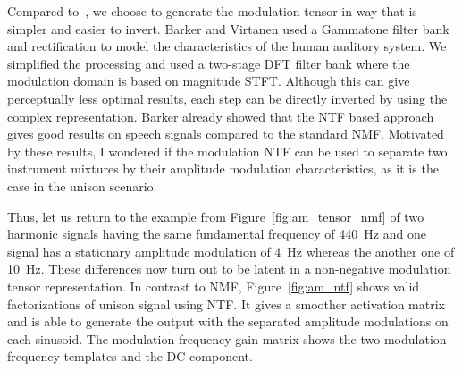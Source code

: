 %
%
\par
Compared to~\cite{barker13}, we choose to generate the modulation tensor in way that is simpler and easier to invert. 
Barker and Virtanen used a Gammatone filter bank and rectification to model the characteristics of the human auditory system. 
We simplified the processing and used a two-stage DFT filter bank where the modulation domain is based on magnitude STFT. 
Although this can give perceptually less optimal results, each step can be directly inverted by using the complex representation.
Barker already showed that the NTF based approach gives good results on speech signals compared to the standard NMF. 
Motivated by these results, I wondered if the modulation NTF can be used to separate two instrument mixtures by their amplitude modulation characteristics, as it is the case in the unison scenario.
\par
Thus, let us return to the example from Figure~\ref{fig:am_tensor_nmf} of two harmonic signals having the same fundamental frequency of 440~\si{\hertz} and one signal has a stationary amplitude modulation of 4~\si{\hertz} whereas the another one of 10~\si{\hertz}. 
These differences now turn out to be latent in a non-negative modulation tensor representation.
In contrast to NMF, Figure~\ref{fig:am_ntf} shows valid factorizations of unison signal using NTF.
It gives a smoother activation matrix and is able to generate the output with the separated amplitude modulations on each sinusoid. The modulation frequency gain matrix shows the two modulation frequency templates and the DC-component.

